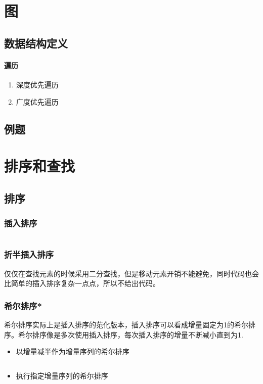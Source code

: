 \documentclass{ctexart}
\begin{document}
\section{图}
\subsection{数据结构定义}

\paragraph{遍历}
\begin{enumerate}
    \item 深度优先遍历
    \item 广度优先遍历
\end{enumerate}

\subsection{例题}


\section{排序和查找}

\subsection{排序}

\subsubsection{插入排序}
\inputminted{c}{codes/insert-sort.c}

\subsubsection{折半插入排序}
仅仅在查找元素的时候采用二分查找，但是移动元素开销不能避免，同时代码也会比简单的插入排序复杂一点点，所以不给出代码。

\subsubsection{希尔排序*}
希尔排序实际上是插入排序的范化版本，插入排序可以看成增量固定为1的希尔排序。希尔排序像是多次使用插入排序，每次插入排序的增量不断减小直到为1.
\begin{itemize}
    \item 以增量减半作为增量序列的希尔排序
        \inputminted{c}{codes/shell-sort.c}
    \item 执行指定增量序列的希尔排序
        \inputminted{c}{codes/shell-sort-specified-incs.c}
\end{itemize}
\end{document}
